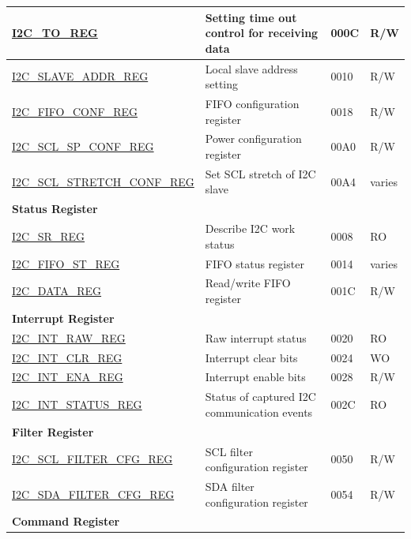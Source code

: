 \begin{longtable}{ | p{6cm} | p{7.2cm} | p{1.3cm} | p{1cm} | }
\hyperref[regdesc:I2CTOREG]{I2C\_TO\_REG} & Setting time out control for receiving data & \hexprefix{}000C & R/W \\ \hline
\hyperref[regdesc:I2CSLAVEADDRREG]{I2C\_SLAVE\_ADDR\_REG} & Local slave address setting & \hexprefix{}0010 & R/W \\ \hline
\hyperref[regdesc:I2CFIFOCONFREG]{I2C\_FIFO\_CONF\_REG} & FIFO configuration register & \hexprefix{}0018 & R/W \\ \hline
\hyperref[regdesc:I2CSCLSPCONFREG]{I2C\_SCL\_SP\_CONF\_REG} & Power configuration register & \hexprefix{}00A0 & R/W \\ \hline
\hyperref[regdesc:I2CSCLSTRETCHCONFREG]{I2C\_SCL\_STRETCH\_CONF\_REG} & Set SCL stretch of I2C slave & \hexprefix{}00A4 & varies \\ \hline
\multicolumn{4}{|l|}{\textbf{Status Register}} \\ \hline
\hyperref[regdesc:I2CSRREG]{I2C\_SR\_REG} & Describe I2C work status & \hexprefix{}0008 & RO \\ \hline
\hyperref[regdesc:I2CFIFOSTREG]{I2C\_FIFO\_ST\_REG} & FIFO status register & \hexprefix{}0014 & varies \\ \hline
\hyperref[regdesc:I2CDATAREG]{I2C\_DATA\_REG} & Read/write FIFO register & \hexprefix{}001C & R/W \\ \hline
\multicolumn{4}{|l|}{\textbf{Interrupt Register}} \\ \hline
\hyperref[regdesc:I2CINTRAWREG]{I2C\_INT\_RAW\_REG} & Raw interrupt status & \hexprefix{}0020 & RO \\ \hline
\hyperref[regdesc:I2CINTCLRREG]{I2C\_INT\_CLR\_REG} & Interrupt clear bits & \hexprefix{}0024 & WO \\ \hline
\hyperref[regdesc:I2CINTENAREG]{I2C\_INT\_ENA\_REG} & Interrupt enable bits & \hexprefix{}0028 & R/W \\ \hline
\hyperref[regdesc:I2CINTSTATUSREG]{I2C\_INT\_STATUS\_REG} & Status of captured I2C communication events & \hexprefix{}002C & RO \\ \hline
\multicolumn{4}{|l|}{\textbf{Filter Register}} \\ \hline
\hyperref[regdesc:I2CSCLFILTERCFGREG]{I2C\_SCL\_FILTER\_CFG\_REG} & SCL filter configuration register & \hexprefix{}0050 & R/W \\ \hline
\hyperref[regdesc:I2CSDAFILTERCFGREG]{I2C\_SDA\_FILTER\_CFG\_REG} & SDA filter configuration register & \hexprefix{}0054 & R/W \\ \hline
\multicolumn{4}{|l|}{\textbf{Command Register}} \\ \hline

\end{longtable}
